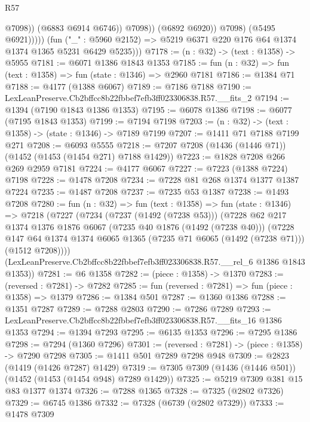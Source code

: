 \begin{lexlean}{R57}
\begin{coremodule}
                              @7098))
                          (@6883 @6914 @6746))
                        @7098))
                    (@6892 @6920))
                  @7098)
                (@5495 @6921)))))
        (fun ("_" : @5960 @2152) => @5219 @6371 @220 @176 @64 @1374 @1374 @1365 @5231 @6429 @5235)))
@7178 := (n : @32) -> (text : @1358) -> @5955
@7181 := @6071 @1386 @1843 @1353
@7185 := fun (n : @32) => fun (text : @1358) => fun (state : @1346) => @2960 @7181
@7186 := @1384 @71
@7188 := @4177 (@1388 @6067)
@7189 := @7186 @7188
@7190 := LexLeanPreserve.Cb2bffcc8b22fbbef7efb3ff023306838.R57.__fits_2
@7194 := @1394 (@7190 @1843 @1386 @1353)
@7195 := @6078 @1386
@7198 := @6077 (@7195 @1843 @1353)
@7199 := @7194 @7198
@7203 := (n : @32) -> (text : @1358) -> (state : @1346) -> @7189 @7199
@7207 := @1411 @71 @7188 @7199 @271
@7208 := @6093 @5555
@7218 := @7207 @7208 (@1436 (@1446 @71)) (@1452 (@1453 (@1454 @271) @7188 @1429))
@7223 := @1828 @7208 @266 @269 @2959 @7181
@7224 := @4177 @6067
@7227 := @7223 (@1388 @7224) @7198
@7228 := @1478 @7208
@7234 := @7228 @81 @268 @1374 @1377 @1387 @7224
@7235 := @1487 @7208
@7237 := @7235 @53 @1387
@7238 := @1493 @7208
@7280 := fun (n : @32) =>
  fun (text : @1358) =>
  fun (state : @1346) =>
  @7218
    (@7227
      (@7234
        (@7237 (@1492 (@7238 @53)))
        (@7228
          @62
          @217
          @1374
          @1376
          @1876
          @6067
          (@7235 @40 @1876 (@1492 (@7238 @40)))
          (@7228
            @147
            @64
            @1374
            @1374
            @6065
            @1365
            (@7235 @71 @6065 (@1492 (@7238 @71)))
            (@1512 @7208))))
      (LexLeanPreserve.Cb2bffcc8b22fbbef7efb3ff023306838.R57.__rel_6 @1386 @1843 @1353))
@7281 := @6 @1358
@7282 := (piece : @1358) -> @1370
@7283 := (reversed : @7281) -> @7282
@7285 := fun (reversed : @7281) => fun (piece : @1358) => @1379
@7286 := @1384 @501
@7287 := @1360 @1386
@7288 := @1351 @7287
@7289 := @7288 @2803
@7290 := @7286 @7289
@7293 := LexLeanPreserve.Cb2bffcc8b22fbbef7efb3ff023306838.R57.__fits_16 @1386 @1353
@7294 := @1394 @7293
@7295 := @6135 @1353
@7296 := @7295 @1386
@7298 := @7294 (@1360 @7296)
@7301 := (reversed : @7281) -> (piece : @1358) -> @7290 @7298
@7305 := @1411 @501 @7289 @7298 @948
@7309 := @2823 (@1419 (@1426 @7287) @1429)
@7319 := @7305 @7309 (@1436 (@1446 @501)) (@1452 (@1453 (@1454 @948) @7289 @1429))
@7325 := @5219 @7309 @381 @15 @83 @1377 @1374
@7326 := @7288 @1365
@7328 := @7325 (@2802 @7326)
@7329 := @6745 @1386
@7332 := @7328 (@6739 (@2802 @7329))
@7333 := @1478 @7309

\end{coremodule}
\end{lexlean}
